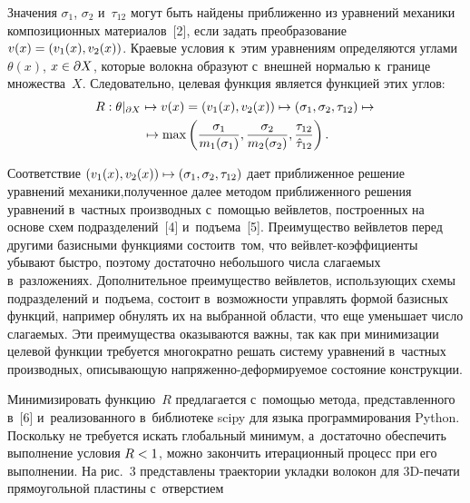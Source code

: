 \begin{multicols}{2}
  Значения $\sigma_1$, $\sigma_2$ и~$\tau_{12}$ могут быть найдены при\-бли\-жен\-но 
из уравнений механики композиционных материалов~[2], если задать 
преобразование $v(x)\hm= (v_1(x), v_2(x))$. Краевые условия к~этим уравнениям 
определяются углами $\theta(x)$, $x\hm\in \partial X$, которые волокна образуют 
с~внеш\-ней нормалью к~границе множества~$X$. Следовательно, целевая функция 
является функцией этих углов:
 \begin{multline*}
  R: \theta\vert_{\partial X} \mapsto v(x)=\left( v_1(x), v_2(x)\right)\mapsto \left( 
\sigma_1, \sigma_2, \tau_{12}\right) \mapsto {}\hspace*{-1.3625pt}\\
{}\mapsto \max \left( 
\displaystyle\frac{\displaystyle \sigma_1\mathstrut}{\displaystyle m_1(\sigma_1)\mathstrut}, \displaystyle\frac{\displaystyle \sigma_2\mathstrut}{\displaystyle m_2(\sigma_2)\mathstrut}, 
\displaystyle\frac{\displaystyle \tau_{12}\mathstrut}{\displaystyle \hat{\tau}_{12}\mathstrut}\right).
\end{multline*}
  
  Соответствие $(v_1(x), v_2(x)) \hm\mapsto (\sigma_1, \sigma_2, \tau_{12})$ дает 
приближенное решение уравнений механики,\linebreak полученное далее методом 
приближенного решения уравнений в~част\-ных производных с~по\-мощью\linebreak 
вейв\-ле\-тов, построенных на основе схем подразделений~[4] и~подъема~[5]. 
Преимущество вейвлетов перед другими базисными функциями состоит\linebreak в~том, что 
вейв\-лет-ко\-эф\-фи\-ци\-ен\-ты убывают быст\-ро, поэтому достаточно небольшого 
числа сла\-га\-емых в~разложениях. Дополнительное преимущество вейвлетов, 
использующих схемы \mbox{подразделений} и~подъема, со\-сто\-ит в~воз\-мож\-ности 
управ\-лять формой базисных функций, например обнулять их на выбранной 
об\-ласти, что еще уменьшает чис\-ло сла\-га\-емых. Эти преимущества оказываются 
важ\-ны, так как при минимизации целевой функции требуется многократно решать 
сис\-те\-му урав\-не\-ний в~част\-ных производных, опи\-сы\-ва\-ющую 
на\-пря\-жен\-но-де\-фор\-ми\-ру\-емое со\-сто\-яние конструкции.
  
  Минимизировать функцию~$R$ предлагается с~по\-мощью метода, 
пред\-став\-лен\-но\-го в~[6] и~реализованного в~биб\-лио\-те\-ке scipy для языка 
программирования Python. Поскольку не требуется искать глобальный минимум, 
а~достаточно обеспечить выполнение условия $R\hm<1$, можно закончить 
итерационный процесс при его выполнении. На рис.~3 пред\-став\-ле\-ны траектории 
уклад\-ки волокон для 3D-пе\-ча\-ти прямоугольной плас\-ти\-ны с~отверстием


\end{multicols}
